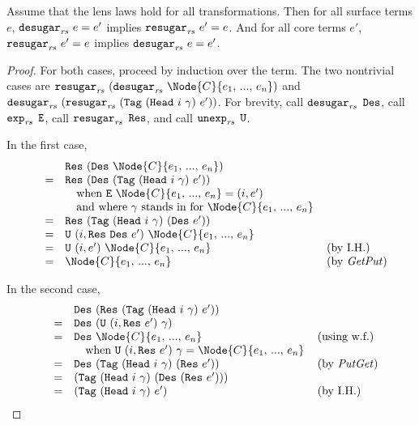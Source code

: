 \begin{theorem}
\label{thm:reval-exp}
Assume that the lens laws hold for all transformations. Then for all
surface terms $e$, $\texttt{desugar}_{\mathit{rs}}\ {e} = e'$ implies $\texttt{resugar}_{\mathit{rs}}\ {e'} =
e$. And for all core terms $e'$, $\texttt{resugar}_{\mathit{rs}}\ {e'} = e$ implies
$\texttt{desugar}_{\mathit{rs}}\ {e} = e'$.
\end{theorem}
\begin{proof}
For both cases, proceed by induction over the term. The two nontrivial
cases are $\UnexpandRec{(\ExpandRec{\Node{C}{e_1,\,...,\,e_n}})}$ and
$\texttt{desugar}_{\mathit{rs}}\ {(\texttt{resugar}_{\mathit{rs}}\ {(\texttt{Tag}\ (\texttt{Head}\ i\ \gamma)\ e')})}$. For brevity, call
$\texttt{desugar}_{\mathit{rs}}$ $\texttt{Des}$, call $\texttt{exp}_{\mathit{rs}}$ $\texttt{E}$, call $\texttt{resugar}_{\mathit{rs}}$
$\texttt{Res}$, and call $\texttt{unexp}_{\mathit{rs}}$ $\texttt{U}$.

In the first case,
\[\begin{array}{llll}
  &&  \UnexpR{(\ExpR{\Node{C}{e_1,\,...,\,e_n}})} \\
  &=& \UnexpR{(\ExpR{\Tag{\MacHead{i}{\gamma}}{e'}})} \\
  &&  \ \ \text{ when }
        \Expd{\Node{C}{e_1,\,...,\,e_n}} = (i, e') \\
  &&  \ \ \text{ and where $\gamma$ stands in for
          $\Node{C}{e_1,\,...,\,e_n}$} \\
  &=& \UnexpR{\Tag{\MacHead{i}{\gamma}}{(\ExpR{e'})}} \\
  &=& \Unexp{(i, \UnexpR{\ExpR{e'}})}{\Node{C}{e_1,\,...,\,e_n}} \\
  &=& \Unexp{(i, e')}{\Node{C}{e_1,\,...,\,e_n}} & \text{ \!(by I.H.)} \\
  &=& \Node{C}{e_1,\,...,\,e_n} &\text{ \!(by \Getput)}
\end{array}\]

In the second case,
\[\begin{array}{llll}
  && \ExpR{(\UnexpR{\Tag{\MacHead{i}{\gamma}}{e'}})} \\
  &=& \ExpR{(\Unexp{(i, \UnexpR{e'})}{\gamma})} \\
  &=& \ExpR{\Node{C}{e_1,\,...,\,e_n}} &\text{ \!(using w.f.)} \\
    && \ \ \text{ when }
       \Unexp{(i, \UnexpR{e'})}{\gamma} = \Node{C}{e_1,\,...,\,e_n} \\
  &=& \ExpR{\Tag{\MacHead{i}{\gamma}}{(\UnexpR{e'})}}
    &\text{ \!(by \Putget)} \\
  &=& \Tag{\MacHead{i}{\gamma}}{(\ExpR{(\UnexpR{e'})})} \\
  &=& \Tag{\MacHead{i}{\gamma}}{e'}
    &\text{ \!(by I.H.)}
\end{array}\]
\end{proof}


